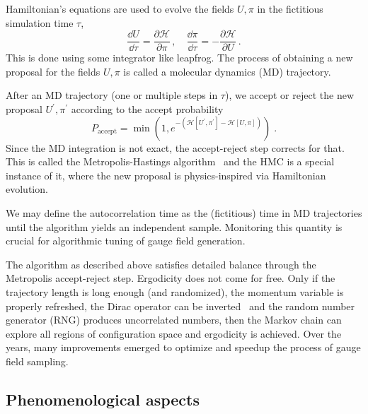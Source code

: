 Hamiltonian's equations are used to evolve the fields $U, \pi$ in the fictitious simulation time $\tau$,
\begin{equation}
\frac{\dd U}{\dd \tau} = \frac{\partial \mathcal{H}}{\partial \pi} \,,
\quad
\frac{\dd \pi}{\dd \tau} = -\frac{\partial \mathcal{H}}{\partial U} \,.
\end{equation}
This is done using some integrator like leapfrog.
The process of obtaining a new proposal for the fields $U, \pi$ is called a molecular dynamics (MD) trajectory.

After an MD trajectory (one or multiple steps in $\tau$), we accept or reject the new proposal $U^{\prime}, \pi^{\prime}$ according to the accept probability
\begin{equation}
P_{\text{accept}} = \min \left( 1, e^{-(\mathcal{H}[U^{\prime}, \pi^{\prime}] - \mathcal{H}[U, \pi])} \right) \;.
\end{equation}
Since the MD integration is not exact, the accept-reject step corrects for that.
This is called the Metropolis-Hastings algorithm~\cite{10.1063/1.1699114,10.1093/biomet/57.1.97} and the HMC is a special instance of it, where the new proposal is physics-inspired via Hamiltonian evolution.

We may define the autocorrelation time as the (fictitious) time in MD trajectories until the algorithm yields an independent sample.
Monitoring this quantity is crucial for algorithmic tuning of gauge field generation.

The algorithm as described above satisfies detailed balance through the Metropolis accept-reject step.
Ergodicity does not come for free.
Only if the trajectory length is long enough (and randomized), the momentum variable is properly refreshed, the Dirac operator can be inverted~\cite{Gupta:1990ka} and the random number generator (RNG) produces uncorrelated numbers, then the Markov chain can explore all regions of configuration space and ergodicity is achieved.
Over the years, many improvements emerged to optimize and speedup the process of gauge field sampling.

\subsection{Phenomenological aspects}


